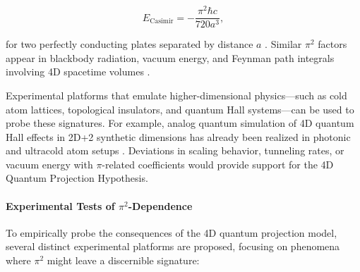 \documentclass[12pt,a4paper]{article}
\begin{document}
\begin{equation}
E_{\text{Casimir}} = -\frac{\pi^2 \hbar c}{720 a^3},
\end{equation}

for two perfectly conducting plates separated by distance \(a\) \cite{milton_casimir_2001,bordag_advanced_2009}. Similar \(\pi^2\) factors appear in blackbody radiation, vacuum energy, and Feynman path integrals involving 4D spacetime volumes \cite{peskin_introduction_1995,extra-dimensions-pi-specific}.

Experimental platforms that emulate higher-dimensional physics—such as cold atom lattices, topological insulators, and quantum Hall systems—can be used to probe these signatures. For example, analog quantum simulation of 4D quantum Hall effects in 2D+2 synthetic dimensions has already been realized in photonic and ultracold atom setups \cite{lohse_exploring_2018,ozawa_topological_2019}. Deviations in scaling behavior, tunneling rates, or vacuum energy with \(\pi\)-related coefficients would provide support for the 4D Quantum Projection Hypothesis.

\paragraph{Experimental Tests of \(\pi^2\)-Dependence}
To empirically probe the consequences of the 4D quantum projection model, several distinct experimental platforms are proposed, focusing on phenomena where \(\pi^2\) might leave a discernible signature:
\end{document}
